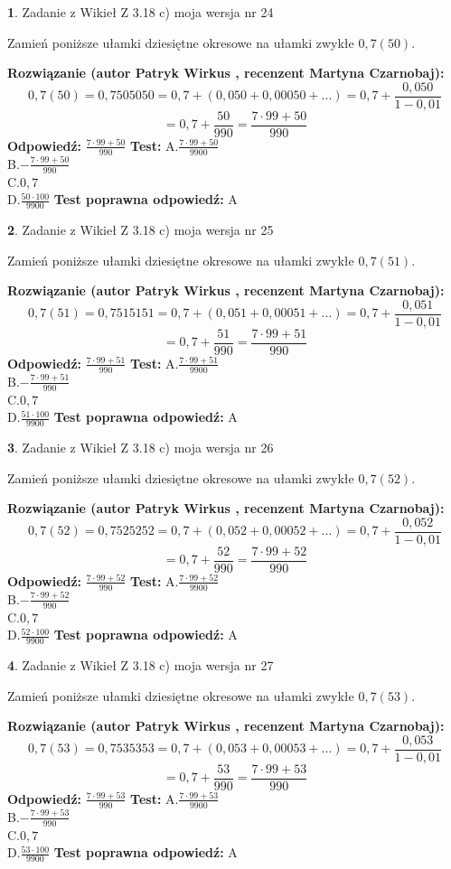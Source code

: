 \documentclass[12pt, a4paper]{article}
\theoremstyle{definition} %
\newtheorem{zad}{}
\newcommand{\zadStart}[1]{\begin{zad}#1\newline}
\newcommand{\zadStop}{\end{zad}}
\newcommand{\rozwStart}[2]{\noindent \textbf{Rozwiązanie (autor #1 , recenzent #2): }\newline}
\newcommand{\rozwStop}{\newline}
\newcommand{\odpStart}{\noindent \textbf{Odpowiedź:}\newline}
\newcommand{\odpStop}{\newline}
\newcommand{\testStart}{\noindent \textbf{Test:}\newline}
\newcommand{\testStop}{\newline}
\newcommand{\kluczStart}{\noindent \textbf{Test poprawna odpowiedź:}\newline}
\newcommand{\kluczStop}{\newline}
\begin{document}
\zadStart{Zadanie z Wikieł Z 3.18 c) moja wersja nr 24}

Zamień poniższe ułamki dziesiętne okresowe na ułamki zwykłe $0,7(50)$.
\zadStop
\rozwStart{Patryk Wirkus}{Martyna Czarnobaj}
$$0,7(50)=0,7505050=0,7+(0,050+0,00050+...)=0,7+\frac{0,050}{1-0,01}$$
$$=0,7+\frac{50}{990}=\frac{7\cdot99+50}{990}$$
\rozwStop
\odpStart
$\frac{7\cdot99+50}{990}$
\odpStop
\testStart
A.$\frac{7\cdot99+50}{9900}$\\ B.$-\frac{7\cdot99+50}{990}$\\ C.$0,7$\\ D.$\frac{50\cdot100}{9900}$
\testStop
\kluczStart
A
\kluczStop



\zadStart{Zadanie z Wikieł Z 3.18 c) moja wersja nr 25}

Zamień poniższe ułamki dziesiętne okresowe na ułamki zwykłe $0,7(51)$.
\zadStop
\rozwStart{Patryk Wirkus}{Martyna Czarnobaj}
$$0,7(51)=0,7515151=0,7+(0,051+0,00051+...)=0,7+\frac{0,051}{1-0,01}$$
$$=0,7+\frac{51}{990}=\frac{7\cdot99+51}{990}$$
\rozwStop
\odpStart
$\frac{7\cdot99+51}{990}$
\odpStop
\testStart
A.$\frac{7\cdot99+51}{9900}$\\ B.$-\frac{7\cdot99+51}{990}$\\ C.$0,7$\\ D.$\frac{51\cdot100}{9900}$
\testStop
\kluczStart
A
\kluczStop



\zadStart{Zadanie z Wikieł Z 3.18 c) moja wersja nr 26}

Zamień poniższe ułamki dziesiętne okresowe na ułamki zwykłe $0,7(52)$.
\zadStop
\rozwStart{Patryk Wirkus}{Martyna Czarnobaj}
$$0,7(52)=0,7525252=0,7+(0,052+0,00052+...)=0,7+\frac{0,052}{1-0,01}$$
$$=0,7+\frac{52}{990}=\frac{7\cdot99+52}{990}$$
\rozwStop
\odpStart
$\frac{7\cdot99+52}{990}$
\odpStop
\testStart
A.$\frac{7\cdot99+52}{9900}$\\ B.$-\frac{7\cdot99+52}{990}$\\ C.$0,7$\\ D.$\frac{52\cdot100}{9900}$
\testStop
\kluczStart
A
\kluczStop



\zadStart{Zadanie z Wikieł Z 3.18 c) moja wersja nr 27}

Zamień poniższe ułamki dziesiętne okresowe na ułamki zwykłe $0,7(53)$.
\zadStop
\rozwStart{Patryk Wirkus}{Martyna Czarnobaj}
$$0,7(53)=0,7535353=0,7+(0,053+0,00053+...)=0,7+\frac{0,053}{1-0,01}$$
$$=0,7+\frac{53}{990}=\frac{7\cdot99+53}{990}$$
\rozwStop
\odpStart
$\frac{7\cdot99+53}{990}$
\odpStop
\testStart
A.$\frac{7\cdot99+53}{9900}$\\ B.$-\frac{7\cdot99+53}{990}$\\ C.$0,7$\\ D.$\frac{53\cdot100}{9900}$
\testStop
\kluczStart
A
\kluczStop
\end{document}
